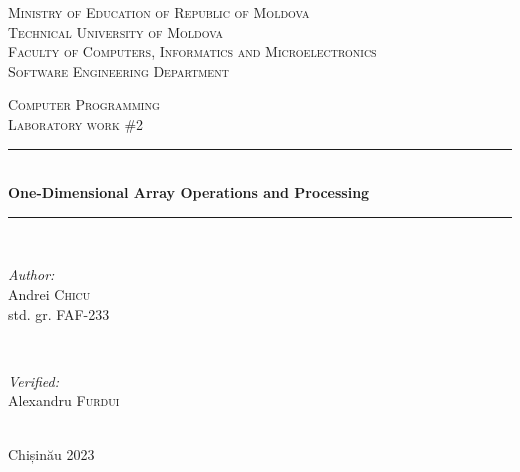 \documentclass[12pt]{article}
\begin{document}
\begin{titlepage}
   \begin{center}
    \textsc{\large Ministry of Education of Republic of Moldova}\\[0.5cm]
    \textsc{\large Technical University of Moldova}\\[0.5cm]
    \textsc{\large Faculty of Computers, Informatics and Microelectronics}\\[0.5cm]
    \textsc{\large Software Engineering Department}\\[1.2cm]
    
    \vspace{25 mm}
    
    \textsc{\Large Computer Programming}\\[0.5cm]
    \textsc{\large Laboratory work \#2}\\[0.5cm]    %
    
    \newcommand{\HRule}{\rule{\linewidth}{0.5mm}}
    \vspace{10 mm}
    \HRule \\[0.4cm]
    { \LARGE \bfseries One-Dimensional Array Operations and Processing }\\[0.4cm] %
    \HRule \\[1.5cm]
    
    \vspace{10mm}
    
    \begin{minipage}[t]{0.4\textwidth}
    \begin{flushleft} \large
    \emph{Author:} \\
    Andrei \textsc{Chicu}\\                         %
    std. gr. FAF-233                                %
    \end{flushleft}
    \end{minipage}
    ~
    \begin{minipage}[t]{0.4\textwidth}
    \begin{flushright} \large
    \emph{Verified:} \\
    Alexandru \textsc{Furdui}\\
    \end{flushright}
    \end{minipage}\\[3cm]
    
    \vspace{5 mm}
    \large Chișinău 2023\\[0.5cm]
    
    \vfill
    \end{center}
\end{titlepage}
\end{document}
